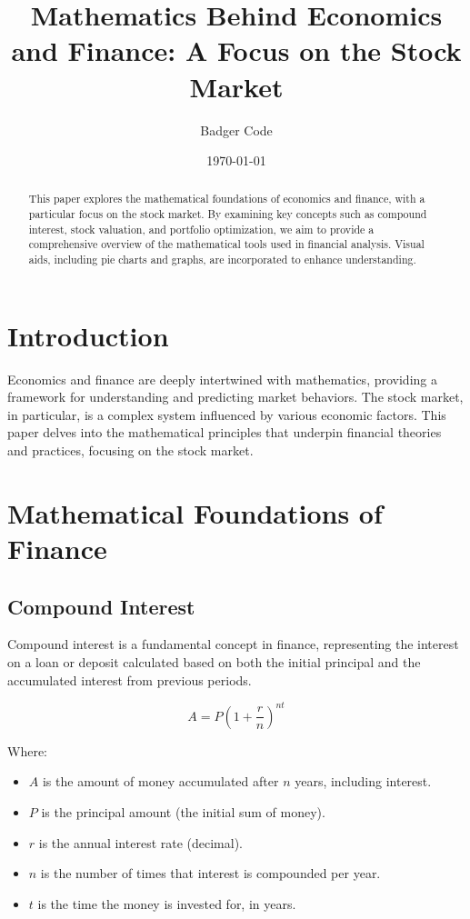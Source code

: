 \documentclass{article}
\title{Mathematics Behind Economics and Finance: A Focus on the Stock Market}
\author{Badger Code}
\date{\today}
\begin{document}
\maketitle

\begin{abstract}
	This paper explores the mathematical foundations of economics and finance, with a particular focus on the stock market. By examining key concepts such as compound interest, stock valuation, and portfolio optimization, we aim to provide a comprehensive overview of the mathematical tools used in financial analysis. Visual aids, including pie charts and graphs, are incorporated to enhance understanding.
\end{abstract}

\section{Introduction}
Economics and finance are deeply intertwined with mathematics, providing a framework for understanding and predicting market behaviors. The stock market, in particular, is a complex system influenced by various economic factors. This paper delves into the mathematical principles that underpin financial theories and practices, focusing on the stock market.

\section{Mathematical Foundations of Finance}
\subsection{Compound Interest}
Compound interest is a fundamental concept in finance, representing the interest on a loan or deposit calculated based on both the initial principal and the accumulated interest from previous periods.

\[
A = P \left(1 + \frac{r}{n}\right)^{nt}
\]

Where:
\begin{itemize}
	\item $A$ is the amount of money accumulated after $n$ years, including interest.
	\item $P$ is the principal amount (the initial sum of money).
	\item $r$ is the annual interest rate (decimal).
	\item $n$ is the number of times that interest is compounded per year.
	\item $t$ is the time the money is invested for, in years.
\end{itemize}
\end{document}
